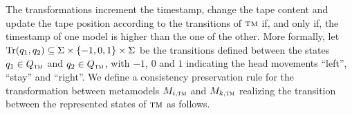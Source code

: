 The transformations increment the timestamp, change the tape content and update the tape position according to the transitions of $\textsc{tm}$ if, and only if, the timestamp of one model is higher than the one of the other.
More formally, let $\operatorname{Tr}(q_1,q_2) \subseteq \Sigma \times \{ -1,0,1 \} \times \Sigma$ be the transitions defined between the states $q_1 \in Q_{\textsc{tm}}$ and $q_2 \in Q_{\textsc{tm}}$, with $-1$, $0$ and $1$ indicating the head movements \enquote{left}, \enquote{stay} and \enquote{right}. 
We define a consistency preservation rule for the transformation between metamodels $\metamodel{M}{i, \TuringMachine}$ and $\metamodel{M}{k, \TuringMachine}$ realizing the transition between the represented states of $\textsc{tm}$ as follows.
